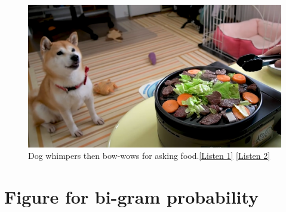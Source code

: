 \begin{figure}[ht]
	\centering
	\includegraphics[width=0.6\columnwidth]{images/whimper_bow-wow.png}
	\caption{Dog whimpers then bow-wows for asking food.\href{https://anonymous.4open.science/r/emnlp2023-937942/audios_in_paper/whimper-bowwow-food_1.wav}{[Listen 1]} \href{https://anonymous.4open.science/r/emnlp2023-937942/audios_in_paper/whimper-bowwow-food_2.wav}{[Listen 2]}}
	\label{fig:Whimper_Bow-wow_food}
\end{figure}

\section{Figure for bi-gram probability}
\label{sec:bigram}

